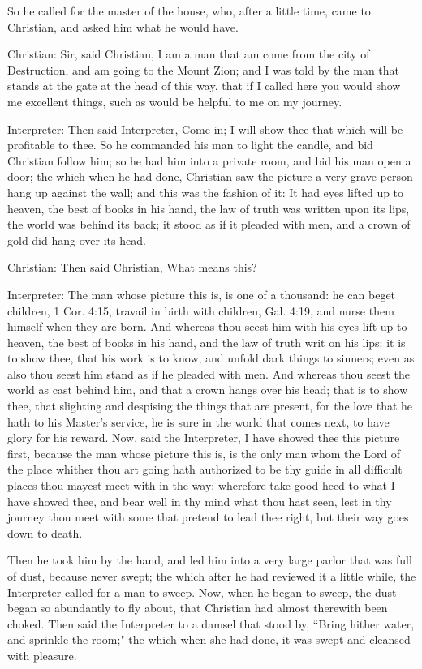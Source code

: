 So he called for the master of the house, who, after a little time, came to Christian, and asked him what he would have.

Christian: Sir, said Christian, I am a man that am come from the city of Destruction, and am going to the Mount Zion; and I was told by the man that stands at the gate at the head of this way, that if I called here you would show me excellent things, such as would be helpful to me on my journey.

Interpreter: Then said Interpreter, Come in; I will show thee that which will be profitable to thee. So he commanded his man to light the candle, and bid Christian follow him; so he had him into a private room, and bid his man open a door; the which when he had done, Christian saw the picture a very grave person hang up against the wall; and this was the fashion of it: It had eyes lifted up to heaven, the best of books in his hand, the law of truth was written upon its lips, the world was behind its back; it stood as if it pleaded with men, and a crown of gold did hang over its head.

Christian: Then said Christian, What means this?

Interpreter: The man whose picture this is, is one of a thousand: he can beget children, 1 Cor. 4:15, travail in birth with children, Gal. 4:19, and nurse them himself when they are born. And whereas thou seest him with his eyes lift up to heaven, the best of books in his hand, and the law of truth writ on his lips: it is to show thee, that his work is to know, and unfold dark things to sinners; even as also thou seest him stand as if he pleaded with men. And whereas thou seest the world as cast behind him, and that a crown hangs over his head; that is to show thee, that slighting and despising the things that are present, for the love that he hath to his Master's service, he is sure in the world that comes next, to have glory for his reward. Now, said the Interpreter, I have showed thee this picture first, because the man whose picture this is, is the only man whom the Lord of the place whither thou art going hath authorized to be thy guide in all difficult places thou mayest meet with in the way: wherefore take good heed to what I have showed thee, and bear well in thy mind what thou hast seen, lest in thy journey thou meet with some that pretend to lead thee right, but their way goes down to death.

Then he took him by the hand, and led him into a very large parlor that was full of dust, because never swept; the which after he had reviewed it a little while, the Interpreter called for a man to sweep. Now, when he began to sweep, the dust began so abundantly to fly about, that Christian had almost therewith been choked. Then said the Interpreter to a damsel that stood by, ``Bring hither water, and sprinkle the room;" the which when she had done, it was swept and cleansed with pleasure.


